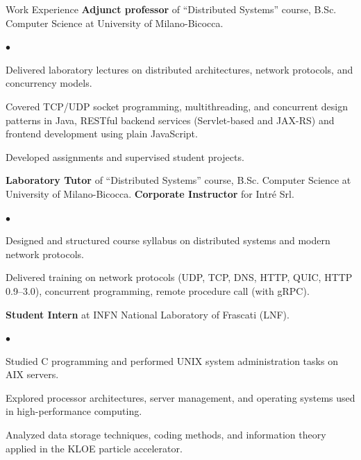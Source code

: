 \begin{rubric}{Work Experience}
 	\entry*[2023 -- Present] \textbf{Adjunct professor} of ``Distributed Systems'' course, B.Sc. Computer Science at University of Milano-Bicocca.
 	
 	\begin{list}{\scriptsize$\bullet$}{%
 			\setlength{\leftmargin}{1em}    %
 			\setlength{\itemsep}{0em}       %
 			\setlength{\topsep}{0em}        %
 			\setlength{\parsep}{0em}        %
 			\setlength{\partopsep}{0em}
 		}
		\item Delivered laboratory lectures on distributed architectures, network protocols, and concurrency models.
 		\item Covered TCP/UDP socket programming, multithreading, and concurrent design patterns in Java, RESTful backend services (Servlet-based and JAX-RS) and frontend development using plain JavaScript.
 		\item Developed assignments and supervised student projects.
 	\end{list}
 	
	\entry*[2024 -- Present] \textbf{Laboratory Tutor} of ``Distributed Systems'' course, B.Sc. Computer Science at University of Milano-Bicocca.
	 \textbf{Corporate Instructor} for Intré Srl.
	
	\begin{list}{\scriptsize$\bullet$}{%
		\setlength{\leftmargin}{1em}    %
		\setlength{\itemsep}{0em}       %
		\setlength{\topsep}{0em}        %
		\setlength{\parsep}{0em}        %
		\setlength{\partopsep}{0em}
	}
		\item Designed and structured course syllabus on distributed systems and modern network protocols.
		\item Delivered training on network protocols (UDP, TCP, DNS, HTTP, QUIC, HTTP 0.9--3.0), concurrent programming, remote procedure call (with gRPC).
	\end{list}
     \textbf{Student Intern} at INFN National Laboratory of Frascati (LNF).

	\begin{list}{\scriptsize$\bullet$}{%
		\setlength{\leftmargin}{1em}    %
		\setlength{\itemsep}{0em}       %
		\setlength{\topsep}{0em}        %
		\setlength{\parsep}{0em}        %
		\setlength{\partopsep}{0em}
	}
    	\item Studied C programming and performed UNIX system administration tasks on AIX servers.
    	\item Explored processor architectures, server management, and operating systems used in high-performance computing.
    	\item Analyzed data storage techniques, coding methods, and information theory applied in the KLOE particle accelerator.
    \end{list}
\end{rubric}